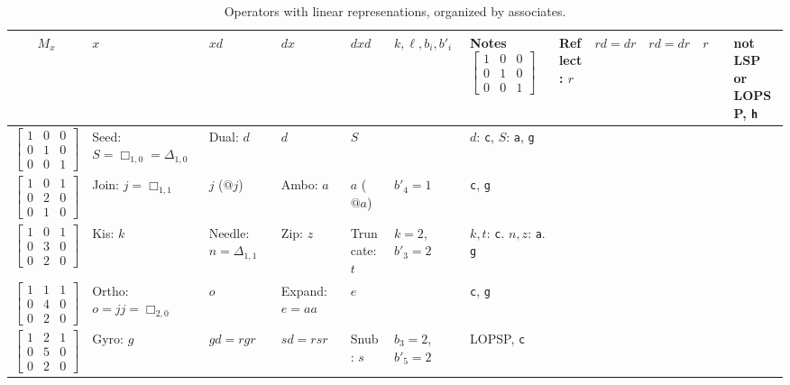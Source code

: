 \documentclass{amsart}[12pt]
\begin{document}
\begin{longtable}{c|m{2cm}|m{2cm}|m{2cm}|m{2cm}|m{1.7cm}|m{2.5cm}}
    \caption{Operators with linear represenations, organized by associates.}
    \\
    $M_x$ & $x$ & $xd$ & $dx$ & $dxd$ & $k, \ell, b_i, b'_i$ & Notes
    \endhead \hline
    $\begin{bmatrix}
    1 & 0 & 0 \\
    0 & 1 & 0 \\
    0 & 0 & 1 \end{bmatrix}$& Reflect: $r$ & $rd=dr$ & $rd=dr$ & $r$ & & not LSP or LOPSP, \texttt{h}
    \\ \hline
    $\begin{bmatrix}
    1 & 0 & 0 \\
    0 & 1 & 0 \\
    0 & 0 & 1 \end{bmatrix}$& Seed: $S=\Box_{1,0} =\Delta_{1,0}$ & Dual: $d$ & $d$ & $S$ & & $d$: \texttt{c}, $S$: \texttt{a}, \texttt{g}
    \\ \hline
    $\begin{bmatrix}
    1 & 0 & 1 \\
    0 & 2 & 0 \\
    0 & 1 & 0 \end{bmatrix}$& Join: ${j=\Box_{1,1}}$ & $j$ ($@j$) & Ambo: $a$ & $a$ ($@a$)& $b'_4=1$ &\texttt{c}, \texttt{g}
    \\ \hline
    $\begin{bmatrix}
    1 & 0 & 1 \\
    0 & 3 & 0 \\
    0 & 2 & 0 \end{bmatrix}$& Kis: $k$ & Needle: $n =\Delta_{1,1}$ & Zip: $z$ & Truncate: $t$ & ${k=2}$, ${b'_3=2}$ &$k, t$: \texttt{c}. $n, z$: \texttt{a}. \texttt{g}
    \\ \hline
    $\begin{bmatrix}
    1 & 1 & 1 \\
    0 & 4 & 0 \\
    0 & 2 & 0 \end{bmatrix}$& Ortho: ${o=jj=\Box_{2,0}}$ & $o$ & Expand: ${e=aa}$ & $e$ & &\texttt{c}, \texttt{g}
    \\ \hline
    $\begin{bmatrix}
    1 & 2 & 1 \\
    0 & 5 & 0 \\
    0 & 2 & 0 \end{bmatrix}$& Gyro: $g$ & $gd=rgr$ & $sd=rsr$ & Snub: $s$ & ${b_3=2}$, ${b'_5=2}$ &LOPSP, \texttt{c}

\end{longtable}
\end{document}
